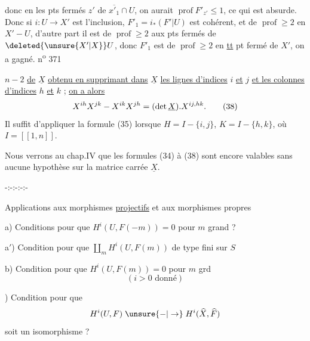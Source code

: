 donc en les pts fermés $z'$ de $\overline{x'_1}\cap U$, on aurait $\operatorname{prof}F'_{z'}\leq 1$, ce qui est absurde. Donc si $i:U\to X'$ est l'inclusion, $F'_1=i_*(F'|U)$ est cohérent, et  de $\operatorname{prof}\geq 2$ en $X'-U$, d'autre part il est de $\operatorname{prof}\geq 2$ aux pts fermés de $\deleted{\unsure{X'|X}}U$, donc $F'_1$ est de $\operatorname{prof}\geq 2$ en \uline{tt} pt fermé de $X'$, on a gagné.
\hfill n\textsuperscript{o} 371

$n-2$ \uline{de} $\underline{X}$ \uline{obtenu en supprimant dans} $\underline{X}$ \uline{les lignes d'indices} $i$ \uline{et} $j$ \uline{et les colonnes d'indices} $h$ \uline{et} $k$ ; \uline{on a alors}
\[
\csname tagsleft@true\endcsname
X^{ih}X^{jk}-X^{ik}X^{jh}=(\det\underline{X}).X^{ij,hk}.\tag*{(38)}
\]
Il suffit d'appliquer la formule (35) lorsque $H=I-\{i,j\}$, $K=I-\{h,k\}$, où $I=[\![1,n]\!]$.

Nous verrons au chap.IV que les formules (34) à (38) sont encore valables sans aucune hypothèse sur la matrice carrée $\underline{X}$.

\begin{center}
-:-:-:-:-
\end{center}
\begin{flushright}
Applications aux morphismes \uline{ projectifs} et aux morphismes propres
\end{flushright}

a) Conditions pour que $H^i(U,F(-m))=0$ pour $m$ grand ?

a$'$) Condition pour que $\coprod_m H^i(U,F(m))$ de type fini sur $S$

b) Condition pour que $H^i(U,F(m))=0$ pour $m$ grd
\[
(i>0\text{ donné})
\]

) Condition pour que
\[
H^i(U,F)\mathrel{\unsure{-|\to}}H^i(\widehat X,\widehat F)
\]
soit un isomorphisme ?

